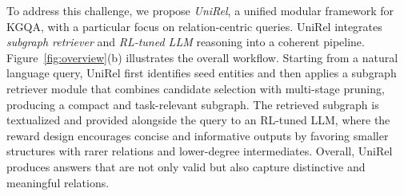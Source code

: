 To address this challenge, we propose \textit{UniRel}, a unified modular framework for KGQA, with a particular focus on relation-centric queries.
UniRel integrates \textit{subgraph retriever} and \textit{RL-tuned LLM} reasoning into a coherent pipeline.
Figure~\ref{fig:overview}(b) illustrates the overall workflow.
Starting from a natural language query, UniRel first identifies seed entities and then applies a subgraph retriever module that combines candidate selection with multi-stage pruning, producing a compact and task-relevant subgraph.
The retrieved subgraph is textualized and provided alongside the query to an RL-tuned LLM, where the reward design encourages concise and informative outputs by favoring smaller structures with rarer relations and lower-degree intermediates.
Overall, UniRel produces answers that are not only valid but also capture distinctive and meaningful relations.





